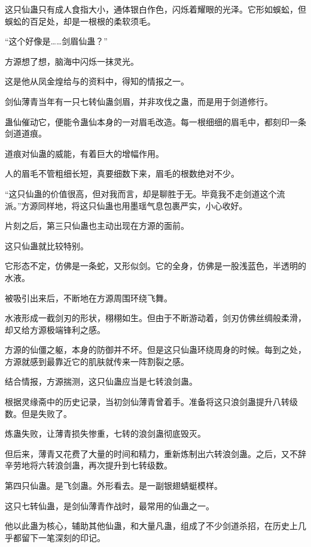 
\begin{this_body}



这只仙蛊只有成人食指大小，通体银白作色，闪烁着耀眼的光泽。它形如蜈蚣，但蜈蚣的百足处，却是一根根的柔软须毛。

“这个好像是……剑眉仙蛊？”

方源想了想，脑海中闪烁一抹灵光。

这是他从凤金煌给与的资料中，得知的情报之一。

剑仙薄青当年有一只七转仙蛊剑眉，并非攻伐之蛊，而是用于剑道修行。

蛊仙催动它，便能令蛊仙本身的一对眉毛改造。每一根细细的眉毛中，都刻印一条剑道道痕。

道痕对仙蛊的威能，有着巨大的增幅作用。

人的眉毛不管粗细长短，真要细数下来，眉毛的根数绝对不少。

“这只仙蛊的价值很高，但对我而言，却是聊胜于无。毕竟我不走剑道这个流派。”方源同样地，将这只仙蛊也用墨瑶气息包裹严实，小心收好。

片刻之后，第三只仙蛊也主动出现在方源的面前。

这只仙蛊就比较特别。

它形态不定，仿佛是一条蛇，又形似剑。它的全身，仿佛是一股浅蓝色，半透明的水液。

被吸引出来后，不断地在方源周围环绕飞舞。

水液形成一截剑刃的形状，栩栩如生。但由于不断游动着，剑刃仿佛丝绸般柔滑，却又给方源极端锋利之感。

方源的仙僵之躯，本身的防御并不坏。但是这只仙蛊环绕周身的时候。每到之处，方源就感到最靠近它的肌肤就传来一阵割裂之感。

结合情报，方源揣测，这只仙蛊应当是七转浪剑蛊。

根据灵缘斋中的历史记录，当初剑仙薄青曾着手。准备将这只浪剑蛊提升八转级数。但是失败了。

炼蛊失败，让薄青损失惨重，七转的浪剑蛊彻底毁灭。

但后来，薄青又花费了大量的时间和精力，重新炼制出六转浪剑蛊。之后，又不辞辛劳地将六转浪剑蛊，再次提升到七转级数。

第四只仙蛊。是飞剑蛊。外形看去。是一副银翅蜻蜓模样。

这只七转仙蛊，是剑仙薄青作战时，最常用的仙蛊之一。

他以此蛊为核心，辅助其他仙蛊，和大量凡蛊，组成了不少剑道杀招，在历史上几乎都留下一笔深刻的印记。


\end{this_body}
